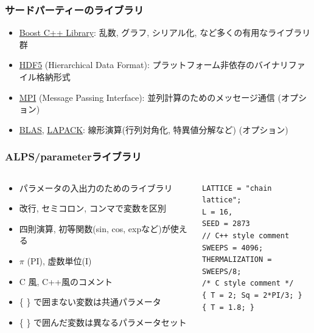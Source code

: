 \begin{frame}[t,fragile]
  \frametitle{サードパーティーのライブラリ}
  \begin{itemize}
    \setlength{\itemsep}{1em}
  \item \href{http://www.boost.org/}{Boost C++ Library}: 乱数, グラフ, シリアル化, など多くの有用なライブラリ群
  \item \href{http://www.hdfgroup.org/HDF5/}{HDF5} (Hierarchical Data Format): プラットフォーム非依存のバイナリファイル格納形式
  \item \href{http://www.mpi-forum.org/}{MPI} (Message Passing Interface): 並列計算のためのメッセージ通信 (オプション)
  \item \href{http://www.netlib.org/blas/}{BLAS}, \href{http://www.netlib.org/lapack/}{LAPACK}: 線形演算(行列対角化, 特異値分解など) (オプション)
  \end{itemize}
\end{frame}

\begin{frame}[t,fragile]
  \frametitle{ALPS/parameterライブラリ}
  \begin{columns}[T]
    \begin{column}{.5\textwidth}
      \begin{itemize}
      \item パラメータの入出力のためのライブラリ
        \item 改行, セミコロン, コンマで変数を区別
        \item 四則演算, 初等関数(sin, cos, expなど)が使える
        \item $\pi$ (PI), 虚数単位(I)
          \item C 風, C++風のコメント
          \item \{ \} で囲まない変数は共通パラメータ
          \item \{ \} で囲んだ変数は異なるパラメータセット
      \end{itemize}
    \end{column}
    \begin{column}{.5\textwidth}
    \begin{lstlisting}
LATTICE = "chain lattice";
L = 16,
SEED = 2873
// C++ style comment
SWEEPS = 4096;
THERMALIZATION = SWEEPS/8;
/* C style comment */
{ T = 2; Sq = 2*PI/3; }
{ T = 1.8; }
\end{lstlisting}
    \end{column}
  \end{columns}
\end{frame}

